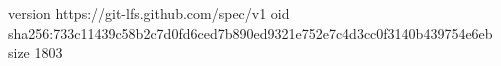 version https://git-lfs.github.com/spec/v1
oid sha256:733c11439c58b2c7d0fd6ced7b890ed9321e752e7c4d3cc0f3140b439754e6eb
size 1803
